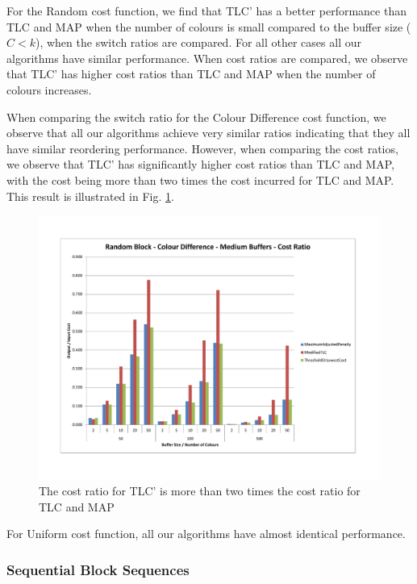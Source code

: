 For the Random cost function, we find that TLC' has a better performance than TLC and MAP when the number of colours is small compared to the buffer size ($ C < k$), when the switch ratios are compared. For all other cases all our algorithms have similar performance. When cost ratios are compared, we observe that TLC' has higher cost ratios than TLC and MAP when the number of colours increases. 

When comparing the switch ratio for the Colour Difference cost function, we observe that all our algorithms achieve very similar ratios indicating that they all have similar reordering performance.  However, when comparing the cost ratios, we observe that TLC' has significantly higher cost ratios than TLC and MAP, with the cost being more than two times the cost incurred for TLC and MAP. This result is illustrated in Fig. \ref{randomBlockCDMediumCost}.

\begin{figure}[ht]
\centering 
\includegraphics[scale=0.60]{Random-Block-cd-medium-cost.pdf}
\caption{The cost ratio for TLC' is more than two times the cost ratio for TLC and MAP}
\label{randomBlockCDMediumCost}
\end{figure}   

For Uniform cost function, all our algorithms have almost identical performance. 

\subsubsection{Sequential Block Sequences}

